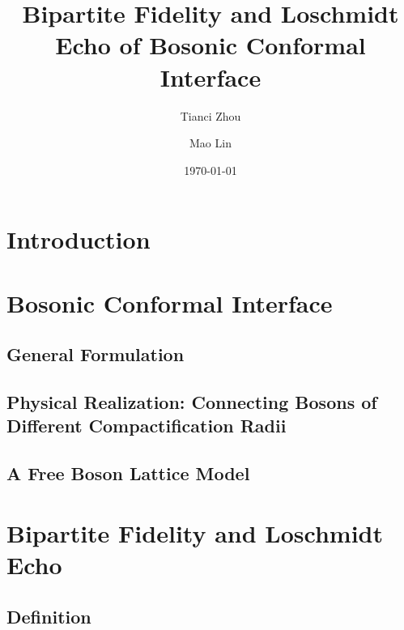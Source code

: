 \documentclass[preprint, prb]{revtex4-1}
\begin{document}
\title{Bipartite Fidelity and Loschmidt Echo of Bosonic Conformal Interface}
 
\author{Tianci Zhou}

\author{Mao Lin}

\date{\today}

\begin{abstract}
\end{abstract}

\maketitle

\section{Introduction}


\section{Bosonic Conformal Interface}
\subsection{General Formulation}
\subsection{Physical Realization: Connecting Bosons of Different Compactification Radii}
\subsection{A Free Boson Lattice Model}

\section{Bipartite Fidelity and Loschmidt Echo}
\subsection{Definition}
\end{document}

